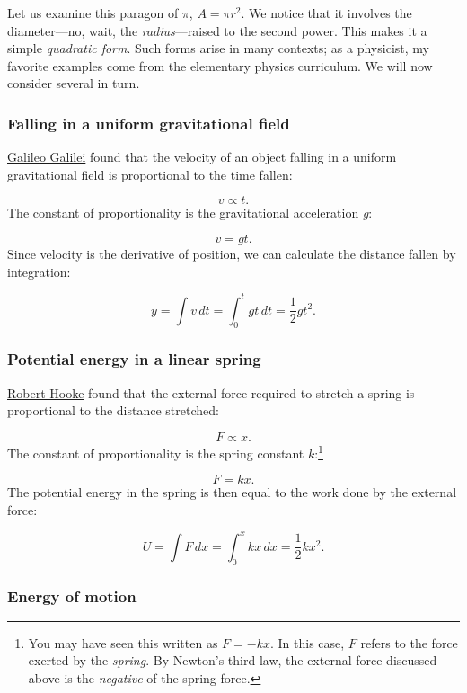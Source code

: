 \documentclass{article}
\begin{document}
Let us examine this paragon of $\pi$, $A = \pi r^2$. We notice that it involves the diameter---no, wait, the \emph{radius}---raised to the second power. This makes it a simple \emph{quadratic form}. Such forms arise in many contexts; as a physicist, my favorite examples come from the elementary physics curriculum. We will now consider several in turn.

    \subsubsection{Falling in a uniform gravitational field} %
    \label{sec:falling_in_a_uniform_gravitational_field}

\href{http://en.wikipedia.org/wiki/Galileo_Galilei}{Galileo Galilei} found that the velocity of an object falling in a uniform gravitational field is proportional to the time fallen:

\[ v \propto t. \]
The constant of proportionality is the gravitational acceleration \emph{g}:

\[ v = g t. \]
Since velocity is the derivative of position, we can calculate the distance fallen by integration:

\[ y = \int v\,dt = \int_0^t gt\,dt = \textstyle{\frac{1}{2}} gt^2. \]


    \subsubsection{Potential energy in a linear spring} %
    \label{sec:potential_energy_in_a_linear_spring}

\href{http://en.wikipedia.org/wiki/Robert_Hooke}{Robert Hooke} found that the external force required to stretch a spring is proportional to the distance stretched:

\[ F \propto x. \]
The constant of proportionality is the spring constant $k$:\footnote{You may have seen this written as $F = -kx$. In this case, $F$ refers to the force exerted by the \emph{spring}. By Newton's third law, the external force discussed above is the \emph{negative} of the spring force.}

\[ F = k x. \]
The potential energy in the spring is then equal to the work done by the external force:

\[ U = \int F\,dx = \int_0^x kx\,dx = \textstyle{\frac{1}{2}} kx^2. \]

    \subsubsection{Energy of motion} %
    \label{sec:energy_of_motion}
\end{document}
